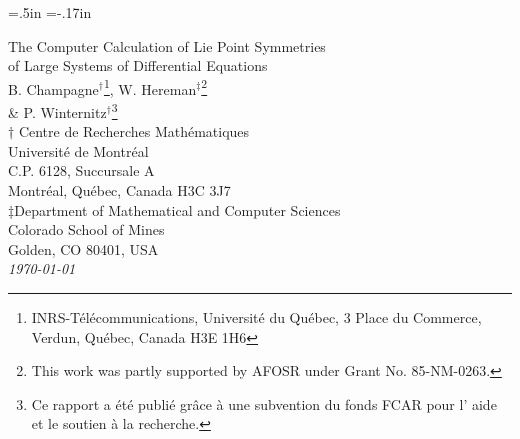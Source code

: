 

\textwidth=5.6in
\textheight=8.1in
\parskip=0pt  %
\oddsidemargin=.5in
\topmargin=-.17in

\def\C{{\rm\kern.24em \vrule width.02em height1.4ex depth-.05ex \kern-.26em
C}}
\def\R{{\rm I\kern-.20em R}}
\def\Z{{\rm\kern.26em \vrule width.02em height0.5ex depth0ex \kern.04em
\vrule  width.02em height1.47ex depth-1ex \kern-.34em Z}}
\def\N{{\rm I\kern-.20em N}}
\def\Q{{\rm\kern.24em \vrule width.02em height1.4ex depth-.05ex \kern-.26em
Q}}



\begin{titlepage}

\begin{center}
{\Large The Computer Calculation of Lie Point Symmetries} \\
{\Large of Large Systems of Differential Equations}  \\[.25in] 
B. Champagne$^{\dagger}$\footnote[1]{INRS-T\'{e}l\'{e}communications, 
Universit\'{e} du Qu\'{e}bec, 3 Place du Commerce, Verdun, Qu\'{e}bec,
Canada H3E 1H6}, 
W. Hereman$^{\ddagger}$\footnote[2]{This work was partly supported by AFOSR
under Grant No. 85-NM-0263.}\\
\& P. Winternitz$^{\dagger}$\footnote[3]{Ce rapport a \'{e}t\'{e} publi\'{e} 
gr\^{a}ce \`{a} une subvention
du fonds FCAR pour l' aide et le 
soutien \`{a} la recherche.} \\[.25in]

$\dagger$ Centre de Recherches Math\'{e}matiques \\
Universit\'{e} de Montr\'{e}al \\
C.P. 6128, Succursale A \\
Montr\'{e}al, Qu\'{e}bec, Canada H3C 3J7 \\ [.25in]

$\ddagger$Department of Mathematical and Computer Sciences  \\
Colorado School of Mines \\
Golden, CO 80401, USA \\[.60in]

{\em \today}\\
\end{center}
\vskip 5pt

\end{titlepage}

